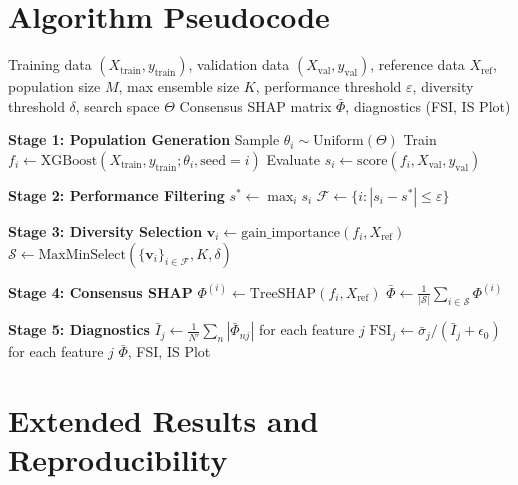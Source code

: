 \documentclass[10pt]{article}
\begin{document}
\appendix

\section{Algorithm Pseudocode}
\label{app:algorithm}

\begin{algorithm}[htbp]
\caption{DASH Pipeline}
\label{alg:dash}
\begin{algorithmic}[1]
\REQUIRE Training data $(X_{\text{train}}, y_{\text{train}})$, validation
  data $(X_{\text{val}}, y_{\text{val}})$, reference data $X_{\text{ref}}$,
  population size $M$, max ensemble size $K$, performance threshold
  $\varepsilon$, diversity threshold $\delta$, search space $\Theta$
\ENSURE Consensus SHAP matrix $\bar{\Phi}$, diagnostics (FSI, IS Plot)

\STATE \textbf{Stage 1: Population Generation}
  \STATE Sample $\theta_i \sim \text{Uniform}(\Theta)$
  \STATE Train $f_i \gets \text{XGBoost}(X_{\text{train}}, y_{\text{train}};
    \theta_i, \text{seed}=i)$
  \STATE Evaluate $s_i \gets \text{score}(f_i, X_{\text{val}}, y_{\text{val}})$
\ENDFOR

\STATE \textbf{Stage 2: Performance Filtering}
\STATE $s^* \gets \max_i s_i$
\STATE $\mathcal{F} \gets \{i : |s_i - s^*| \leq \varepsilon\}$

\STATE \textbf{Stage 3: Diversity Selection}
  \STATE $\mathbf{v}_i \gets \text{gain\_importance}(f_i, X_{\text{ref}})$
\ENDFOR
\STATE $\mathcal{S} \gets \text{MaxMinSelect}(\{\mathbf{v}_i\}_{i \in \mathcal{F}},
  K, \delta)$

\STATE \textbf{Stage 4: Consensus SHAP}
  \STATE $\Phi^{(i)} \gets \text{TreeSHAP}(f_i, X_{\text{ref}})$
\ENDFOR
\STATE $\bar{\Phi} \gets \frac{1}{|\mathcal{S}|} \sum_{i \in \mathcal{S}}
  \Phi^{(i)}$

\STATE \textbf{Stage 5: Diagnostics}
\STATE $\bar{I}_j \gets \frac{1}{N'}\sum_n |\bar{\Phi}_{nj}|$ for each
  feature $j$
\STATE $\text{FSI}_j \gets \bar{\sigma}_j / (\bar{I}_j + \epsilon_0)$ for
  each feature $j$
\RETURN $\bar{\Phi}$, FSI, IS Plot
\end{algorithmic}
\end{algorithm}

\section{Extended Results and Reproducibility}
\label{app:full_sweep}
\end{document}
